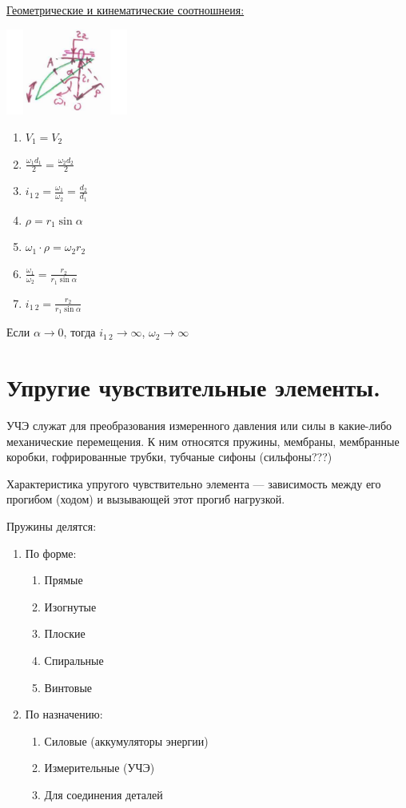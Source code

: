 \documentclass{article}
\begin{document}
\begin{multicols}{3}
\underline{Геометрические и кинематические соотношнеия:} 

\includegraphics[width = 0.3\textwidth]{18_2}
\begin{enumerate}
	\item $V_1 = V_2$
	\item $ \frac{ \omega_1 d_1}{2} = \frac{\omega_2 d_2}{2} $
	\item $i_{1\:2} = \frac{\omega_1}{\omega_2} = \frac{d_2}{d_1} $
	\item $\rho = r_1 \sin {\alpha}$
	\item $\omega_1 \cdot \rho = \omega_2 r_2$
	\item $ \frac{\omega_1}{\omega_2} = \frac{r_2}{r_1 \sin{ \alpha}} $
	\item $ i_{1\:2} = \frac{r_2}{r_1 \sin { \alpha}} $
\end{enumerate}

Если $ \alpha \to 0$, тогда $i_{1\:2} \to \infty$, $\omega_2 \to \infty$
\section {\tiny Упругие чувствительные элементы.}

УЧЭ служат для преобразования измеренного давления или силы в какие-либо механические перемещения. К ним относятся пружины,
мембраны, мембранные коробки, гофрированные трубки, тубчаные сифоны (сильфоны???)

Характеристика упругого чувствительно элемента --- зависимость между его прогибом (ходом) и вызывающей этот прогиб нагрузкой.

Пружины делятся:
\begin{enumerate}
	\item По форме:
	\begin{enumerate}
		\item Прямые
		\item Изогнутые
		\item Плоские
		\item Спиральные
		\item Винтовые
	\end{enumerate}
	\item По назначению:
	\begin{enumerate}
		\item Силовые (аккумуляторы энергии)
		\item Измерительные (УЧЭ)
		\item Для соединения деталей
	\end{enumerate}
\end{enumerate}


\end{multicols}
\end{document}
